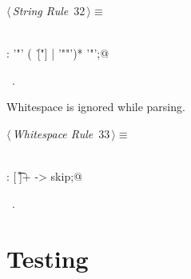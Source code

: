 \documentclass[a4paper]{report}
\begin{document}
\begin{flushleft} \small
\begin{minipage}{\linewidth}\label{scrap32}\raggedright\small
{} $\langle\,${\itshape String Rule}\nobreak\ {\footnotesize {32}}$\,\rangle\equiv$
\vspace{-1ex}
\begin{list}{}{} \item
\mbox{}\verb@@\\
\mbox{}\verb@STRING: '"' (~[\r\n"] | '""')* '"';@\\
\mbox{}\verb@@{\NWsep}
\end{list}
\vspace{-1.5ex}
\footnotesize
\begin{list}{}{\setlength{\itemsep}{-\parsep}\setlength{\itemindent}{-\leftmargin}}
\item \NWtxtMacroRefIn\ .

\item{}
\end{list}
\end{minipage}\vspace{4ex}
\end{flushleft}
Whitespace is ignored while parsing.
\begin{flushleft} \small
\begin{minipage}{\linewidth}\label{scrap33}\raggedright\small
{} $\langle\,${\itshape Whitespace Rule}\nobreak\ {\footnotesize {33}}$\,\rangle\equiv$
\vspace{-1ex}
\begin{list}{}{} \item
\mbox{}\verb@@\\
\mbox{}\verb@WS : [ \t\r\n]+ -> skip;@\\
\mbox{}\verb@@{\NWsep}
\end{list}
\vspace{-1.5ex}
\footnotesize
\begin{list}{}{\setlength{\itemsep}{-\parsep}\setlength{\itemindent}{-\leftmargin}}
\item \NWtxtMacroRefIn\ .

\item{}
\end{list}
\end{minipage}\vspace{4ex}
\end{flushleft}
\section{Testing}
\end{document}
